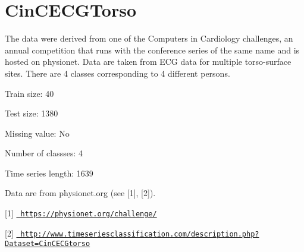 \chapter{Cin\+CECGTorso}
\hypertarget{md_external_2data_2UCRArchive__2018_2CinCECGTorso_2README}{}\label{md_external_2data_2UCRArchive__2018_2CinCECGTorso_2README}
\label{md_external_2data_2UCRArchive__2018_2CinCECGTorso_2README_autotoc_md34}%
%
 The data were derived from one of the Computers in Cardiology challenges, an annual competition that runs with the conference series of the same name and is hosted on physionet. Data are taken from ECG data for multiple torso-\/surface sites. There are 4 classes corresponding to 4 different persons.

Train size\+: 40

Test size\+: 1380

Missing value\+: No

Number of classses\+: 4

Time series length\+: 1639

Data are from physionet.\+org (see \mbox{[}1\mbox{]}, \mbox{[}2\mbox{]}).

\mbox{[}1\mbox{]} \href{https://physionet.org/challenge/}{\texttt{ https\+://physionet.\+org/challenge/}}

\mbox{[}2\mbox{]} \href{http://www.timeseriesclassification.com/description.php?Dataset=CinCECGtorso}{\texttt{ http\+://www.\+timeseriesclassification.\+com/description.\+php?\+Dataset=\+Cin\+CECGtorso}} 